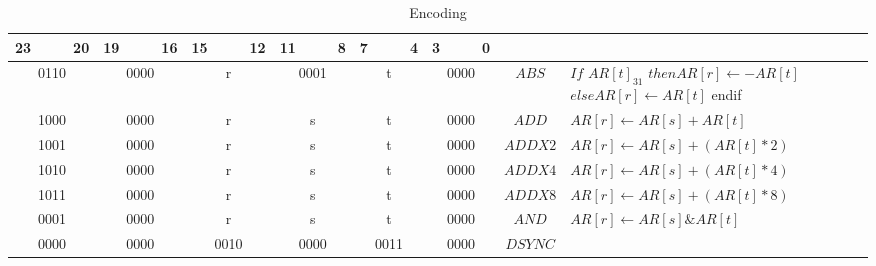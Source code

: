\setlength{\tabcolsep}{4pt}
\renewcommand{\arraystretch}{2}
	\begin{longtable}{llllllllllllllllllllllll  p{1cm}  p{6cm} | }
		\caption{Encoding\label{long}}\\
		23 & & & 20 & 19 & & & 16 & 15 & & & 12 & 11 & & & 8 & 7 & & & 4 & 3 & & & 0 & & \multicolumn{1}{c}{}\\
		\hline
        \endhead
		\multicolumn{4}{|c|}{0110} & \multicolumn{4}{c|}{0000} & \multicolumn{4}{c|}{r} & \multicolumn{4}{c|}{0001} & \multicolumn{4}{c|}{t} & \multicolumn{4}{c|}{0000} & \multicolumn{1}{c|}{$ABS$} & $If$ $AR[t]_{31}$ $then AR[r] \leftarrow -AR[t]$ \newline $else AR[r] \leftarrow AR[t]$ \newline endif \\ \hline
		\multicolumn{4}{|c|}{1000} & \multicolumn{4}{c|}{0000} & \multicolumn{4}{c|}{r} & \multicolumn{4}{c|}{s} & \multicolumn{4}{c|}{t} & \multicolumn{4}{c|}{0000} & \multicolumn{1}{c|}{$ADD$} & $AR[r] \leftarrow AR[s] + AR[t]$ \\ \hline
		\multicolumn{4}{|c|}{1001} & \multicolumn{4}{c|}{0000} & \multicolumn{4}{c|}{r} & \multicolumn{4}{c|}{s} & \multicolumn{4}{c|}{t} & \multicolumn{4}{c|}{0000} & \multicolumn{1}{c|}{$ADDX2$} & $AR[r] \leftarrow AR[s] + (AR[t]*2)$ \\ \hline
		\multicolumn{4}{|c|}{1010} & \multicolumn{4}{c|}{0000} & \multicolumn{4}{c|}{r} & \multicolumn{4}{c|}{s} & \multicolumn{4}{c|}{t} & \multicolumn{4}{c|}{0000} & \multicolumn{1}{c|}{$ADDX4$} & $AR[r] \leftarrow AR[s] + (AR[t]*4)$ \\ \hline
		\multicolumn{4}{|c|}{1011} & \multicolumn{4}{c|}{0000} & \multicolumn{4}{c|}{r} & \multicolumn{4}{c|}{s} & \multicolumn{4}{c|}{t} & \multicolumn{4}{c|}{0000} & \multicolumn{1}{c|}{$ADDX8$} & $AR[r] \leftarrow AR[s] + (AR[t]*8)$ \\ \hline
		\multicolumn{4}{|c|}{0001} & \multicolumn{4}{c|}{0000} & \multicolumn{4}{c|}{r} & \multicolumn{4}{c|}{s} & \multicolumn{4}{c|}{t} & \multicolumn{4}{c|}{0000} & \multicolumn{1}{c|}{$AND$} & $AR[r] \leftarrow AR[s] \& AR[t]$ \\ \hline
		\multicolumn{4}{|c|}{0000} & \multicolumn{4}{c|}{0000} & \multicolumn{4}{c|}{0010} & \multicolumn{4}{c|}{0000} & \multicolumn{4}{c|}{0011} & \multicolumn{4}{c|}{0000} & \multicolumn{1}{c|}{$DSYNC$} &  \\ \hline

\end{longtable}
